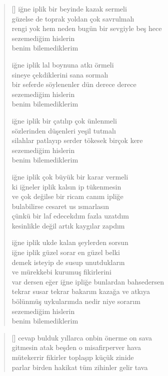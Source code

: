 \documentclass[a5paper, openright, twoside]{memoir}
\begin{document}
\begin{verse}[\versewidth]
  iğne iplik bir beyinde kazak sermeli \\
  güzelse de toprak yoldan çok savrulmalı \\
  rengi yok hem neden bugün bir sevgiyle beş hece \\
  sezemediğim hislerin \\
  benim bilemediklerim

  iğne iplik lal boynuna atkı örmeli \\
  sineye çekdiklerini sana sormalı \\
  bir seferde söylenenler dün derece derece \\
  sezemediğim hislerin \\
  benim bilemediklerim

  iğne iplik bir çatılıp çok ünlenmeli \\
  sözlerinden düşenleri yeşil tutmalı \\
  silahlar patlayıp serder tökesek birçok kere \\
  sezemediğim hislerin \\
  benim bilemediklerim

  iğne iplik çok büyük bir karar vermeli \\
  ki iğneler iplik kalsın ip tükenmesin \\
  ve çok değilse bir ricam canım ipliğe \\
  bulabilirse cesaret us ısmarlasın \\
  çünkü bir laf edecekdım fazla uzatdım \\
  kesinlikle değil artık kaygılar zapdım

  iğne iplik ukde kalan şeylerden sorsun \\
  iğne iplik güzel sorar en güzel belki \\
  demek isteyip de susup unutdukların \\
  ve mürekkebi kurumuş fikirlerini \\
  var dersen eğer iğne ipliğe bunlardan bahsedersen \\
  tekrar susar tekrar bakarım kazağa ve atkıya \\
  bölünmüş uykularımda nedir niye sorarım \\
  sezemediğim hislerin \\
  benim bilemediklerim \\
\end{verse}
\begin{verse}[\versewidth]
  cevap bulduk yıllarca onbin önerme on sava \\
  gitmesin atak beşden o misafirperver hava \\
  mütekerrir fikirler toplaşıp küçük zinide \\
  parlar birden hakikat tüm zihinler gelir tava \\
\end{verse}
\end{document}
